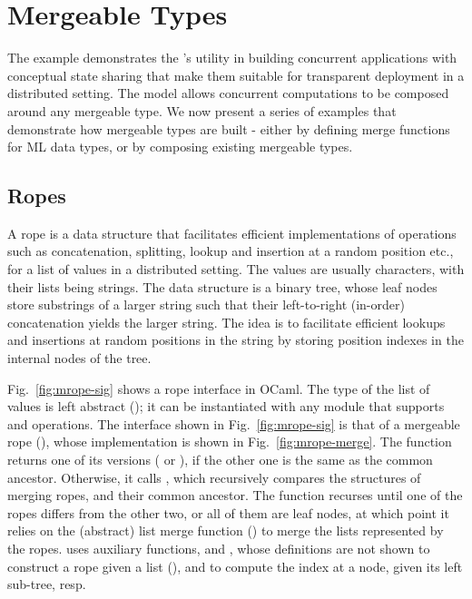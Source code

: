 \section{Mergeable Types}
\label{sec:mergeable_types}



The \drawsome example demonstrates the \name's utility in building
concurrent applications with conceptual state sharing that make them
suitable for transparent deployment in a distributed setting. The
model allows concurrent computations to be composed around any
mergeable type. We now present a series of examples that demonstrate
how mergeable types are built - either by defining merge functions for
ML data types, or by composing existing mergeable types.

\subsection{Ropes}
\label{sec:ropes}

A rope is a data structure that facilitates efficient implementations
of operations such as concatenation, splitting, lookup and insertion
at a random position etc., for a list of values in a distributed
setting. The values are usually characters, with their lists being
strings. The data structure is a binary tree, whose leaf nodes store
substrings of a larger string such that their left-to-right (in-order)
concatenation yields the larger string. The idea is to facilitate
efficient lookups and insertions at random positions in the string by
storing position indexes in the internal nodes of the tree.

Fig.~\ref{fig:mrope-sig} shows a rope interface in OCaml. The type of
the list of values is left abstract (); it can be instantiated
with any module that supports  and  operations. The
interface shown in Fig.~\ref{fig:mrope-sig} is that of a mergeable
rope (), whose  implementation is shown in
Fig.~\ref{fig:mrope-merge}. The function returns one of its versions
( or ), if the other one is the same as the common
ancestor. Otherwise, it calls , which recursively
compares the structures of merging ropes, and their common ancestor.
The function recurses until one of the ropes differs from the other
two, or all of them are leaf nodes, at which point it relies on the
(abstract) list merge function () to merge the lists
represented by the ropes.  uses auxiliary functions,
 and , whose definitions are not shown to
construct a rope given a list (), and to compute the index at a
node, given its left sub-tree, resp.

